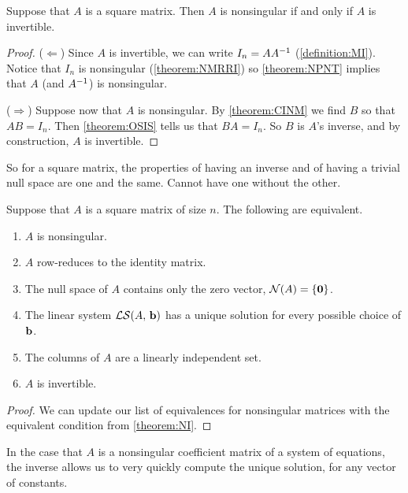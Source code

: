 \documentclass{ximera}
\begin{document}
\begin{theorem}
  \label{theorem:NI}

  Suppose that $A$ is a square matrix.  Then $A$ is nonsingular if and only if $A$ is invertible.
  
  \begin{proof}
    ($\Leftarrow$) Since $A$ is invertible, we can write
    $I_n=AA^{-1}$ (\ref{definition:MI}).  Notice that $I_n$ is
    nonsingular (\ref{theorem:NMRRI}) so \ref{theorem:NPNT} implies
    that $A$ (and $A^{-1}$) is nonsingular.

    ($\Rightarrow$) Suppose now that $A$ is nonsingular.  By
    \ref{theorem:CINM} we find $B$ so that $AB=I_n$.  Then
    \ref{theorem:OSIS} tells us that $BA=I_n$.  So $B$ is $A$'s
    inverse, and by construction, $A$ is invertible.

  \end{proof}
\end{theorem}

So for a square matrix, the properties of having an inverse and of
having a trivial null space are one and the same.  Cannot have one
without the other.

\begin{theorem}
  Suppose that $A$ is a square matrix of size $n$.  The following are equivalent.
  \begin{enumerate}\item $A$ is nonsingular.
  \item $A$ row-reduces to the identity matrix.
  \item The null space of $A$ contains only the zero vector, $\mathcal{N}\!\left(A\right)=\left\{\mathbf{0}\right\}$.
  \item The linear system $\mathcal{LS}\!\left(A,\,\mathbf{b}\right)$ has a unique solution for every possible choice of $\mathbf{b}$.
  \item The columns of $A$ are a linearly independent set.
  \item $A$ is invertible.
  \end{enumerate}
  
  \begin{proof}
    We can update our list of equivalences for nonsingular matrices
    with the equivalent condition from \ref{theorem:NI}.
  \end{proof}
\end{theorem}

In the case that $A$ is a nonsingular coefficient matrix of a system
of equations, the inverse allows us to very quickly compute the unique
solution, for any vector of constants.
\end{document}
